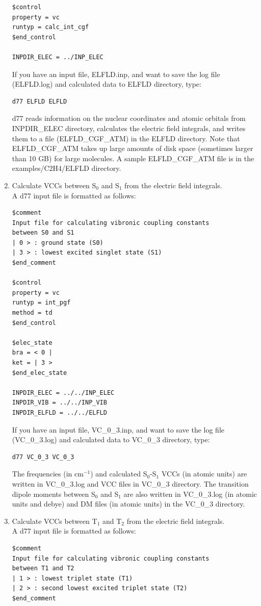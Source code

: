 ﻿\documentclass[11pt,a4paper,openany]{article}
\begin{document}
\begin{enumerate}
{\begin{verbatim}
$control
property = vc
runtyp = calc_int_cgf
$end_control

INPDIR_ELEC = ../INP_ELEC
\end{verbatim}
If you have an input file, ELFLD.inp, and want to save the log file (ELFLD.log) and calculated data to ELFLD directory, type:
\begin{verbatim} 
d77 ELFLD ELFLD
\end{verbatim}
d77 reads information on the nuclear coordinates and atomic orbitals from \\
INPDIR\_ELEC directory, calculates the electric field integrals, and writes them to a file (ELFLD\_CGF\_ATM) in the ELFLD directory. Note that ELFLD\_CGF\_ATM takes up large amounts of disk space (sometimes larger than 10 GB) for large molecules. A sample ELFLD\_CGF\_ATM file is in the examples/C2H4/ELFLD directory.
}

\item{Calculate VCCs between S$_0$ and S$_1$ from the electric field integrals.\\
A d77 input file is formatted as follows:
\begin{verbatim} 
$comment
Input file for calculating vibronic coupling constants
between S0 and S1
| 0 > : ground state (S0)
| 3 > : lowest excited singlet state (S1)
$end_comment

$control
property = vc
runtyp = int_pgf
method = td
$end_control

$elec_state
bra = < 0 |
ket = | 3 >
$end_elec_state

INPDIR_ELEC = ../../INP_ELEC
INPDIR_VIB = ../../INP_VIB
INPDIR_ELFLD = ../../ELFLD
\end{verbatim}
If you have an input file, VC\_0\_3.inp, and want to save the log file (VC\_0\_3.log) and calculated data to VC\_0\_3 directory, type:
\begin{verbatim} 
d77 VC_0_3 VC_0_3
\end{verbatim}
The frequencies (in cm$^{-1}$) and calculated S$_0$-S$_1$ VCCs (in atomic units) are written in VC\_0\_3.log and VCC files in VC\_0\_3 directory. The transition dipole moments between S$_0$ and S$_1$ are also written in VC\_0\_3.log (in atomic units and debye) and DM files (in atomic units) in the VC\_0\_3 directory.}

\item{Calculate VCCs between T$_1$ and T$_2$ from the electric field integrals.\\
A d77 input file is formatted as follows:
\begin{verbatim} 
$comment
Input file for calculating vibronic coupling constants
between T1 and T2
| 1 > : lowest triplet state (T1)
| 2 > : second lowest excited triplet state (T2)
$end_comment


\end{verbatim}}
\end{enumerate}
\end{document}
